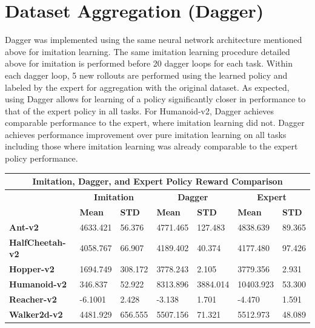 \documentclass{article}
\begin{document}
    \pagebreak

    \section{Dataset Aggregation (Dagger)}
    Dagger was implemented using the same neural network architecture 
    mentioned above for imitation learning. The same imitation learning 
    procedure detailed above for imitation is performed before 20 dagger loops for 
    each task. Within each dagger loop, 5 new rollouts are performed using the 
    learned policy and labeled by the expert for aggregation with the original 
    dataset. As expected, using Dagger allows for learning of a policy significantly 
    closer in performance to that of the expert policy in all tasks. For 
    Humanoid-v2, Dagger achieves comparable performance to the expert, where imitation
    learning did not. Dagger achieves performance improvement over 
    pure imitation learning on all tasks including those where imitation learning was already 
    comparable to the expert policy performance.\\

    \noindent\begin{tabular}{ |p{3cm}||p{1.5cm}|p{1.5cm}|p{1.5cm}|p{1.5cm}|p{1.5cm}|p{1.5cm}| }
        \hline
        \multicolumn{7}{|c|}{\textbf{Imitation, Dagger, and Expert Policy Reward Comparison}} \\
        \hline
        & \multicolumn{2}{|c|}{\textbf{Imitation}} & \multicolumn{2}{|c|}{\textbf{Dagger}} & \multicolumn{2}{|c|}{\textbf{Expert}} \\
        \cline{2-7}
        & \textbf{Mean} & \textbf{STD} & \textbf{Mean} & \textbf{STD} & \textbf{Mean} & \textbf{STD} \\
        \hline
        \textbf{Ant-v2}         & 4633.421    & 56.376      & 4771.465      & 127.483       & 4838.639      & 89.365 \\
        \hline
        \textbf{HalfCheetah-v2} & 4058.767    & 66.907      & 4189.402      & 40.374        & 4177.480      & 97.426 \\
        \hline
        \textbf{Hopper-v2}      & 1694.749    & 308.172     & 3778.243      & 2.105         & 3779.356      & 2.931 \\
        \hline
        \textbf{Humanoid-v2}    & 346.837     & 52.922      & 8313.896      & 3884.014      & 10403.923     & 53.300 \\
        \hline
        \textbf{Reacher-v2}     & -6.1001     & 2.428       & -3.138        & 1.701         & -4.470        & 1.591 \\
        \hline
        \textbf{Walker2d-v2}    & 4481.929    &656.555      & 5507.156      & 71.321        & 5512.973      & 48.089\\
        \hline
    \end{tabular}
\end{document}
